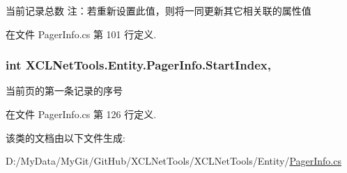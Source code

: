 当前记录总数 注：若重新设置此值，则将一同更新其它相关联的属性值 



在文件 Pager\-Info.\-cs 第 101 行定义.

\hypertarget{class_x_c_l_net_tools_1_1_entity_1_1_pager_info_a659b36bf635a3fed41ee3b82ec4c2cbe}{
\subsubsection[{Start\-Index}]{\setlength{\rightskip}{0pt plus 5cm}int X\-C\-L\-Net\-Tools.\-Entity.\-Pager\-Info.\-Start\-Index\hspace{0.3cm}{\ttfamily [get]}, {\ttfamily [set]}}}\label{class_x_c_l_net_tools_1_1_entity_1_1_pager_info_a659b36bf635a3fed41ee3b82ec4c2cbe}


当前页的第一条记录的序号 



在文件 Pager\-Info.\-cs 第 126 行定义.



该类的文档由以下文件生成\-:\begin{DoxyCompactItemize}
\item 
D\-:/\-My\-Data/\-My\-Git/\-Git\-Hub/\-X\-C\-L\-Net\-Tools/\-X\-C\-L\-Net\-Tools/\-Entity/\hyperlink{_pager_info_8cs}{Pager\-Info.\-cs}\end{DoxyCompactItemize}
